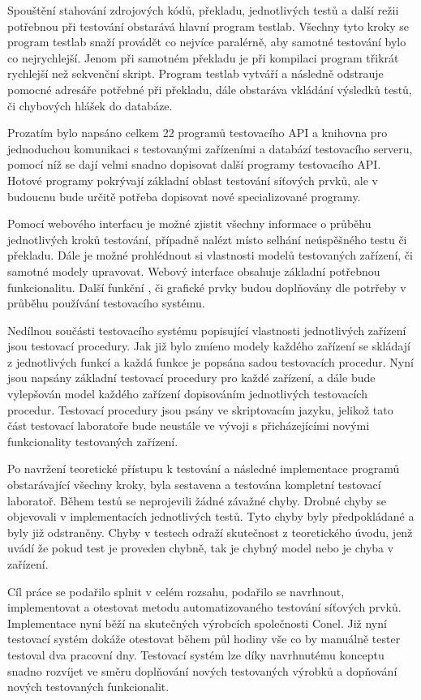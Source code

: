 Spouštění stahování zdrojových kódů, překladu, jednotlivých testů a další režii potřebnou při testování obstarává hlavní program testlab. Všechny tyto kroky se program testlab snaží provádět co nejvíce paralérně, aby samotné testování bylo co nejrychlejší. Jenom při samotném překladu je při kompilaci program třikrát rychlejší než sekvenční skript. Program testlab vytváří a následně odstrauje pomocné adresáře potřebné při překladu, dále obstaráva vkládání výsledků testů, či chybových hlášek do databáze.

Prozatím bylo napsáno celkem 22 programů testovacího API a knihovna pro jednoduchou komunikaci s testovanými zařízeními a databází testovacího serveru, pomocí níž se dají velmi snadno dopisovat další programy testovacího API. Hotové programy pokrývají základní oblast testování síťových prvků, ale v budoucnu bude určitě potřeba dopisovat nové specializované programy.

Pomocí webového interfacu je možné zjistit všechny informace o průběhu jednotlivých kroků testování, případně nalézt místo selhání neúspěšného testu či překladu. Dále je možné prohlédnout si vlastnosti modelů testovaných zařízení, či samotné modely upravovat. Webový interface obsahuje základní potřebnou funkcionalitu. Další funkční , či grafické prvky budou doplňovány dle potrřeby v průběhu používání testovacího systému.

Nedílnou součásti testovacího systému popisující vlastnosti jednotlivých zařízení jsou testovací procedury. Jak již bylo zmíeno modely každého zařízení se skládají z jednotlivých funkcí a každá funkce je popsána sadou testovacích procedur. Nyní jsou napsány základní testovací procedury pro každé zařízení, a dále bude vylepšován model každého zařízení dopisováním jednotlivých testovacích procedur. Testovací procedury jsou psány ve skriptovacím jazyku, jelikož tato část testovací laboratoře bude neustále ve vývoji s přicházejícími novými funkcionality testovaných zařízení.

Po navržení teoretické přístupu k testování a následné implementace programů obstarávající všechny kroky, byla sestavena a testována kompletní testovací laboratoř. Během testů se neprojevili žádné závažné chyby. Drobné chyby se objevovali v implementacích jednotlivých testů. Tyto chyby byly předpokládané a byly již odstraněny. Chyby v testech odraží skutečnost z teoretického úvodu, jenž uvádí že pokud test je proveden chybně, tak je chybný model nebo je chyba v zařízení.

Cíl práce se podařilo splnit v celém rozsahu, podařilo se navrhnout, implementovat a otestovat metodu automatizovaného testování síťových prvků. Implementace nyní běží na skutečných výrobcích společnosti Conel. Již nyní testovací systém dokáže otestovat během půl hodiny vše co by manuálně tester testoval dva pracovní dny. Testovací systém lze díky navrhnutému konceptu snadno rozvíjet ve směru doplňování nových testovaných výrobků a dopňování nových testovaných funkcionalit.

\endinput
